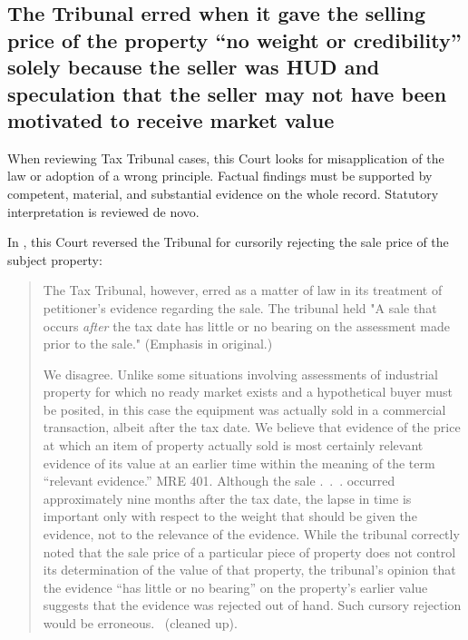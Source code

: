 \documentclass[12pt,\documentclassflag]{michiganCourtOfAppealsBrief}
\begin{document}
\subsection{The Tribunal erred when it gave the selling price of the property ``no weight or credibility'' solely because the seller was HUD and speculation that the seller may not have been motivated to receive market value}

When reviewing Tax Tribunal cases, this Court looks for misapplication of the law or adoption of a wrong principle. Factual findings must be supported by competent, material, and substantial evidence on the whole record. Statutory interpretation is reviewed de novo. 


In \cite[s]{Jones & Laughlin}, this Court reversed the Tribunal for cursorily rejecting the sale price of the subject property:


\begin{quotation}
The Tax Tribunal, however, erred as a matter of law in its treatment of petitioner's evidence regarding the sale. The tribunal held "A sale that occurs {\em after} the tax date has little or no bearing on the assessment made prior to the sale." (Emphasis in original.)

We disagree. Unlike some situations involving assessments of industrial property for which no ready market exists and a hypothetical buyer must be posited, in this case the equipment was actually sold in a commercial transaction, albeit after the tax date.
We believe that evidence of the price at which an item of property actually sold is most certainly relevant evidence of its value at an earlier time within the meaning of the term ``relevant evidence.'' MRE 401. Although the sale .~.~. occurred approximately nine months after the tax date, the lapse in time is important only with respect to the weight that should be given the evidence, not to the relevance of the evidence. While the tribunal correctly noted that the sale price of a particular piece of property does not control its determination of the value of that property, the tribunal's opinion that the evidence ``has little or no bearing'' on the property's earlier value suggests that the evidence was rejected out of hand. Such cursory rejection would be erroneous. \ (cleaned up).
\end{quotation}
\end{document}
